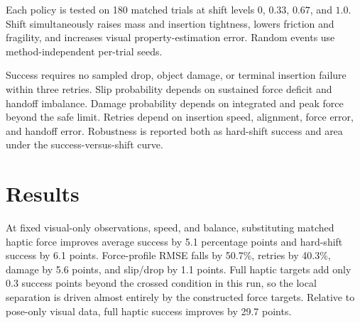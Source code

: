 \documentclass[11pt]{article}
\begin{document}
Each policy is tested on 180 matched trials at shift levels $0$, $0.33$, $0.67$, and $1.0$. Shift simultaneously raises mass and insertion tightness, lowers friction and fragility, and increases visual property-estimation error. Random events use method-independent per-trial seeds.

Success requires no sampled drop, object damage, or terminal insertion failure within three retries. Slip probability depends on sustained force deficit and handoff imbalance. Damage probability depends on integrated and peak force beyond the safe limit. Retries depend on insertion speed, alignment, force error, and handoff error. Robustness is reported both as hard-shift success and area under the success-versus-shift curve.

\section{Results}

\begin{table}[H]
\centering
\small
{}
\caption{Full deterministic sweep. Each row aggregates 720 rollouts. ``Hard success'' is success at shift level 1.0.}
\label{tab:results}
\end{table}

At fixed visual-only observations, speed, and balance, substituting matched haptic force improves average success by 5.1 percentage points and hard-shift success by 6.1 points. Force-profile RMSE falls by 50.7\%, retries by 40.3\%, damage by 5.6 points, and slip/drop by 1.1 points. Full haptic targets add only 0.3 success points beyond the crossed condition in this run, so the local separation is driven almost entirely by the constructed force targets. Relative to pose-only visual data, full haptic success improves by 29.7 points.
\end{document}
